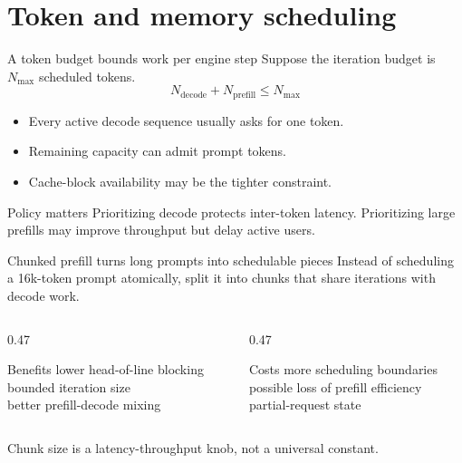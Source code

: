 \documentclass[handout]{beamer}
\begin{document}
\section{Token and memory scheduling}

\begin{frame}{A token budget bounds work per engine step}
  Suppose the iteration budget is $N_{\max}$ scheduled tokens.
  \[
    N_{\text{decode}}+N_{\text{prefill}}\le N_{\max}
  \]
  \begin{itemize}
    \setlength{\itemsep}{8pt}
    \item Every active decode sequence usually asks for one token.
    \item Remaining capacity can admit prompt tokens.
    \item Cache-block availability may be the tighter constraint.
  \end{itemize}
  \begin{alertblock}{Policy matters}
    Prioritizing decode protects inter-token latency. Prioritizing large prefills may improve throughput but delay active users.
  \end{alertblock}
\end{frame}

\begin{frame}{Chunked prefill turns long prompts into schedulable pieces}
  Instead of scheduling a 16k-token prompt atomically, split it into chunks that share iterations with decode work.
  \begin{columns}[t]
    \begin{column}{0.47\linewidth}
      \begin{block}{Benefits}
        lower head-of-line blocking\\bounded iteration size\\better prefill-decode mixing
      \end{block}
    \end{column}
    \begin{column}{0.47\linewidth}
      \begin{alertblock}{Costs}
        more scheduling boundaries\\possible loss of prefill efficiency\\partial-request state
      \end{alertblock}
    \end{column}
  \end{columns}
  Chunk size is a latency-throughput knob, not a universal constant.
\end{frame}
\end{document}

